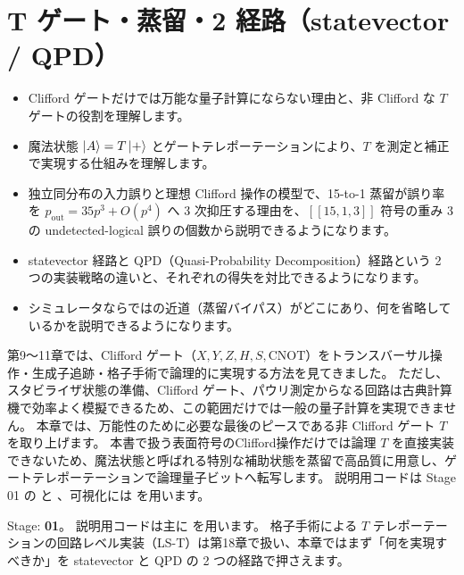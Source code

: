\chapter{T ゲート・蒸留・2 経路（statevector / QPD）}\label{ch:t_gate}

\begin{chaptergoal}
  \begin{itemize}
  \item Clifford ゲートだけでは万能な量子計算にならない理由と、非 Clifford な $T$ ゲートの役割を理解します。
  \item 魔法状態 $\ket{A}=T\ket{+}$ とゲートテレポーテーションにより、$T$ を測定と補正で実現する仕組みを理解します。
  \item 独立同分布の入力誤りと理想 Clifford 操作の模型で、15-to-1 蒸留が誤り率を $p_{\mathrm{out}}=35p^3+O(p^4)$ へ 3 次抑圧する理由を、$[[15,1,3]]$ 符号の重み 3 の undetected-logical 誤りの個数から説明できるようになります。
  \item statevector 経路と QPD（Quasi-Probability Decomposition）経路という 2 つの実装戦略の違いと、それぞれの得失を対比できるようになります。
  \item シミュレータならではの近道（蒸留バイパス）がどこにあり、何を省略しているかを説明できるようになります。
  \end{itemize}
\end{chaptergoal}

第9〜11章では、Clifford ゲート（$X,Y,Z,H,S,\mathrm{CNOT}$）をトランスバーサル操作・生成子追跡・格子手術で論理的に実現する方法を見てきました。
ただし、スタビライザ状態の準備、Clifford ゲート、パウリ測定からなる回路は古典計算機で効率よく模擬できるため、この範囲だけでは一般の量子計算を実現できません\cite{aaronson2004stabilizer}。
本章では、万能性のために必要な最後のピースである非 Clifford ゲート $T$ を取り上げます。
本書で扱う表面符号のClifford操作だけでは論理 $T$ を直接実装できないため、魔法状態と呼ばれる特別な補助状態を蒸留で高品質に用意し、ゲートテレポーテーションで論理量子ビットへ転写します。
説明用コードは Stage 01 の  と 、可視化には  を用います。

\begin{notebox}
  Stage: \textbf{01}。
  説明用コードは主に  を用います。
  格子手術による $T$ テレポーテーションの回路レベル実装（LS-T）は第18章で扱い、本章ではまず「何を実現すべきか」を statevector と QPD の 2 つの経路で押さえます。
\end{notebox}

